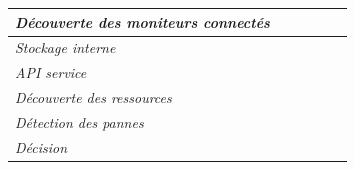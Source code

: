 \begin{table}[h!]
\begin{tabular}{|l|c|c|c|c|c|}
		\textit{Découverte des moniteurs connectés}          & \checkmark                                                                       &                                                                               &                                                                            &                                                                               &                                                                        \\ \hline
		\textit{Stockage interne}                            &                                                                                  &                                                                               & \checkmark                                                                 &                                                                               &                                                                        \\ \hline
		\textit{API service}                                 &                                                                                  &                                                                               &                                                                            &                                                                               &                                                                        \\ \hline
		\hline                                                                              
		\textit{Découverte des ressources}                   & \checkmark                                                                       &                                                                               &                                                                            &                                                                               &                                                                        \\ \hline
		\textit{Détection des pannes}                        &                                                                                  & \checkmark                                                                    &                                                                            &                                                                               &                                                                        \\ \hline
		\textit{Décision}                                    &                                                                                  &                                                                               &                                                                            &                                                                               &                                                                        \\ \hline

\end{tabular}
\end{table}

